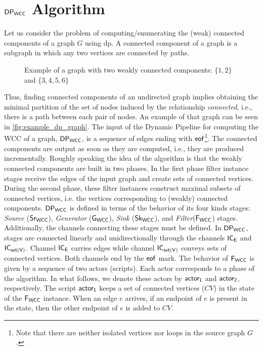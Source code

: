 \section{$\mathsf{DP_{WCC}}$ Algorithm}
Let us consider the problem of computing/enumerating the (weak) connected components of a graph $G$ using \acrshort{dp}. 
A connected component of a graph is a subgraph in which any two vertices are connected by paths. 
\begin{wrapfigure}{r}{0.4\textwidth}
  \begin{center}
\end{center}
\caption[{[PoC] Graph WCC Example}]{Example of a graph with two weakly connected components: $\{1,2\}$ and $\{3,4,5,6\}$}
\label{fig:example_dp_graph}
\end{wrapfigure}
Thus, finding connected components of an undirected graph implies obtaining the minimal partition of the set of nodes induced by the relationship \textit{connected}, i.e., there is a path between each pair of nodes. An example of that graph can be seen in \autoref{fig:example_dp_graph}.
The input of the Dynamic Pipeline for computing the WCC of a graph, $\mathsf{DP_{WCC}}$, is a sequence of edges ending with $\mathsf{eof}$\footnote{Note that there are neither isolated vertices nor loops in the source graph $G$.}. The connected components are output as soon as they are computed, i.e., they are produced incrementally. 
Roughly speaking the idea of the algorithm is that the weakly connected components are built in two phases. In the first phase filter instance stages receive the edges of the input graph and create sets of connected vertices. 
During the second phase, these filter instances construct maximal subsets of connected vertices, i.e. the vertices corresponding to (weakly) connected components.
%
$\mathsf{DP_{WCC}}$ is defined in terms of the behavior of its four kinds stages: \textit{Source} ($\mathsf{Sr_{WCC}}$),  \textit{Generator} ($\mathsf{G_{WCC}}$),  \textit{Sink} ($\mathsf{Sk_{WCC}}$), and \textit{Filter}($\mathsf{F_{WCC}}$) stages. Additionally,  the channels connecting these stages must be defined. 
In $\mathsf{DP_{WCC}}$, stages are connected linearly and unidirectionally through the channels $\mathsf{IC_E}$ and  $\mathsf{IC_{set(V)}}$. Channel $\mathsf{IC_E}$ carries edges while channel  $\mathsf{IC_{set(V)}}$ conveys sets of connected vertices. Both channels end by the $\mathsf{eof}$ mark. 
The behavior of $\mathsf{F_{WCC}}$ is given by a sequence of two actors (scripts). Each actor corresponds to a phase of the algorithm. In what follows, we denote these actors by $\mathsf{actor_1}$ and $\mathsf{actor_2}$, respectively. 
The script $\mathsf{actor_1}$ keeps a set of connected vertices ($CV$) in the state of the $\mathsf{F_{WCC}}$ instance. When an edge $e$ arrives, if an endpoint of $e$ is present in the state, then the other endpoint of $e$ is added to $CV$. 
